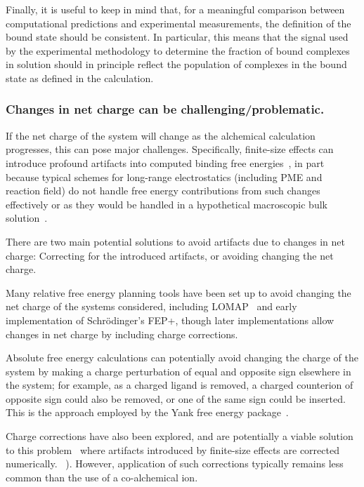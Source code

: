 \documentclass[9pt,bestpractices]{livecoms}
\begin{document}
Finally, it is useful to keep in mind that, for a meaningful comparison between computational predictions and experimental measurements, the definition of the bound state should be consistent.
In particular, this means that the signal used by the experimental methodology to determine the fraction of bound complexes in solution should in principle reflect the population of complexes in the bound state as defined in the calculation.

\subsubsection{Changes in net charge can be challenging/problematic.}

If the net charge of the system will change as the alchemical calculation progresses, this can pose major challenges.
Specifically, finite-size effects can introduce profound artifacts into computed binding free energies~\cite{}, in part because typical schemes for long-range electrostatics (including PME and reaction field) do not handle free energy contributions from such changes effectively or as they would be handled in a hypothetical macroscopic bulk solution~\cite{}.

There are two main potential solutions to avoid artifacts due to changes in net charge: Correcting for the introduced artifacts, or avoiding changing the net charge.

Many relative free energy planning tools have been set up to avoid changing the net charge of the systems considered, including LOMAP~\cite{} and early implementation of Schr\"{o}dinger's FEP+, though later implementations allow changes in net charge by including charge corrections.

Absolute free energy calculations can potentially avoid changing the charge of the system by making a charge perturbation of equal and opposite sign elsewhere in the system; for example, as a charged ligand is removed, a charged counterion of opposite sign could also be removed, or one of the same sign could be inserted.
This is the approach employed by the Yank free energy package~\cite{wang2013identifying}.

Charge corrections have also been explored, and are potentially a viable solution to this problem~\cite{} where artifacts introduced by finite-size effects are corrected numerically.
~\cite{chen2018accurate}). However, application of such corrections typically remains less common than the use of a co-alchemical ion.
\end{document}
